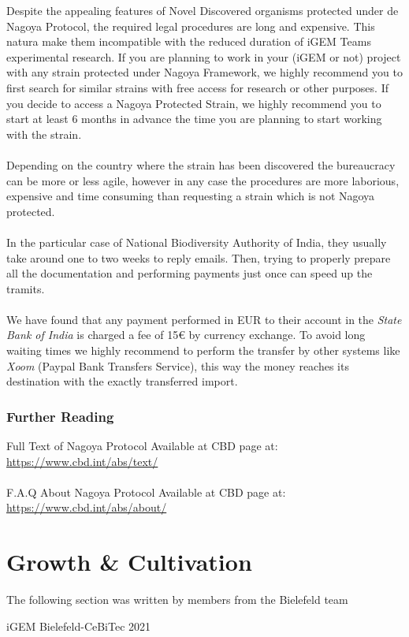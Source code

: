 Despite the appealing features of Novel Discovered organisms protected under de Nagoya Protocol, the required legal procedures are long and expensive. This natura make them incompatible with the reduced duration of iGEM Teams experimental research.  If you are planning to work in your (iGEM or not) project with any strain protected under Nagoya Framework, we highly recommend you to first search for similar strains with free access for research or other purposes. If you decide to access a Nagoya Protected Strain, we highly recommend you to start at least 6 months in advance the time you are planning to start working with the strain. \\ \\
Depending on the country where the strain has been discovered the bureaucracy can be more or less agile, however in any case the procedures are more laborious, expensive and time consuming than requesting a strain which is not Nagoya protected. \\ \\
In the particular case of National Biodiversity Authority of India, they usually take around one to two weeks to reply emails. Then, trying to properly prepare all the documentation and performing payments just once can speed up the tramits. \\ \\ 
We have found that any payment performed in EUR to their account in the \textit{State Bank of India} is charged a fee of 15€ by currency exchange. To avoid long waiting times we highly recommend to perform the transfer by other systems like \textit{Xoom} (Paypal Bank Transfers Service), this way the money reaches its destination with the exactly transferred import. 

\subsubsection{Further Reading}
Full Text of Nagoya Protocol Available at CBD page at: \href{https://www.cbd.int/abs/text/}{https://www.cbd.int/abs/text/} \\ \\
F.A.Q About Nagoya Protocol Available at CBD page at: \href{https://www.cbd.int/abs/about/}{https://www.cbd.int/abs/about/}


\section{Growth \& Cultivation}
\epigraph{The following section was written by members from the Bielefeld team}{iGEM Bielefeld-CeBiTec 2021}
